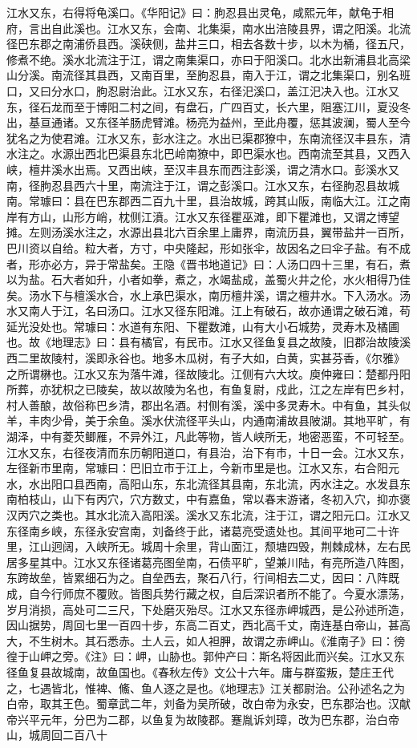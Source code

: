 \documentclass[12pt,UTF8]{ctexbook}
\begin{document}
江水又东，右得将龟溪口。《华阳记》曰：朐忍县出灵龟，咸熙元年，献龟于相府，言出自此溪也。江水又东，会南、北集渠，南水出涪陵县界，谓之阳溪。北流径巴东郡之南浦侨县西。溪硖侧，盐井三口，相去各数十步，以木为桶，径五尺，修煮不绝。溪水北流注于江，谓之南集渠口，亦曰于阳溪口。北水出新浦县北高梁山分溪。南流径其县西，又南百里，至朐忍县，南入于江，谓之北集渠口，别名班口，又曰分水口，朐忍尉治此。江水又东，右径汜溪口，盖江汜决入也。江水又东，径石龙而至于博阳二村之间，有盘石，广四百丈，长六里，阻塞江川，夏没冬出，基亘通诸。又东径羊肠虎臂滩。杨亮为益州，至此舟覆，惩其波澜，蜀人至今犹名之为使君滩。江水又东，彭水注之。水出已渠郡獠中，东南流径汉丰县东，清水注之。水源出西北巴渠县东北巴岭南獠中，即巴渠水也。西南流至其县，又西入峡，檀井溪水出焉。又西出峡，至汉丰县东而西注彭溪，谓之清水口。彭溪水又南，径朐忍县西六十里，南流注于江，谓之彭溪口。江水又东，右径朐忍县故城南。常璩曰：县在巴东郡西二百九十里，县治故城，跨其山阪，南临大江。江之南岸有方山，山形方峭，枕侧江濆。江水又东径瞿巫滩，即下瞿滩也，又谓之博望摊。左则汤溪水注之，水源出县北六百余里上庸界，南流历县，翼带盐井一百所，巴川资以自给。粒大者，方寸，中央隆起，形如张伞，故因名之曰伞子盐。有不成者，形亦必方，异于常盐矣。王隐《晋书地道记》曰：人汤口四十三里，有石，煮以为盐。石大者如升，小者如拳，煮之，水竭盐成，盖蜀火井之伦，水火相得乃佳矣。汤水下与檀溪水合，水上承巴渠水，南历檀井溪，谓之檀井水。下入汤水。汤水又南人于江，名曰汤口。江水又径东阳滩。江上有破石，故亦通谓之破石滩，苟延光没处也。常璩曰：水道有东阳、下瞿数滩，山有大小石城势，灵寿木及橘圃也。故《地理志》曰：县有橘官，有民市。江水又径鱼复县之故陵，旧郡治故陵溪西二里故陵村，溪即永谷也。地多木瓜树，有子大如，白黄，实甚芬香，《尔雅》之所谓楙也。江水又东为落牛滩，径故陵北。江侧有六大坟。庾仲雍曰：楚都丹阳所葬，亦犹枳之已陵矣，故以故陵为名也，有鱼复尉，戍此，江之左岸有巴乡村，村人善酿，故俗称巴乡清，郡出名酒。村侧有溪，溪中多灵寿木。中有鱼，其头似羊，丰肉少骨，美于余鱼。溪水伏流径平头山，内通南浦故县陂湖。其地平旷，有湖泽，中有菱芡鲫雁，不异外江，凡此等物，皆人峡所无，地密恶蛮，不可轻至。江水又东，右径夜清而东历朝阳道口，有县治，治下有市，十日一会。江水又东，左径新市里南，常璩曰：巴旧立市于江上，今新市里是也。江水又东，右合阳元水，水出阳口县西南，高阳山东，东北流径其县南，东北流，丙水注之。水发县东南柏枝山，山下有丙穴，穴方数丈，中有嘉鱼，常以春末游诸，冬初入穴，抑亦褒汉丙穴之类也。其水北流入高阳溪。溪水又东北流，注于江，谓之阳元口。江水又东径南乡峡，东径永安宫南，刘备终于此，诸葛亮受遗处也。其间平地可二十许里，江山迥阔，入峡所无。城周十余里，背山面江，颓塘四毁，荆棘成林，左右民居多星其中。江水又东径诸葛亮图垒南，石债平旷，望兼川陆，有亮所造八阵图，东跨故垒，皆累细石为之。自垒西去，聚石八行，行间相去二丈，因曰：八阵既成，自今行师庶不覆败。皆图兵势行藏之权，自后深识者所不能了。今夏水漂荡，岁月消损，高处可二三尺，下处磨灭殆尽。江水又东径赤岬城西，是公孙述所造，因山据势，周回七里一百四十步，东高二百丈，西北高千丈，南连基白帝山，甚高大，不生树木。其石悉赤。土人云，如人袒胛，故谓之赤岬山。《淮南子》曰：徬徨于山岬之旁。《注》曰：岬，山胁也。郭仲产曰：斯名将因此而兴矣。江水又东径鱼复县故城南，故鱼国也。《春秋左传》文公十六年。庸与群蛮叛，楚庄王代之，七遇皆北，惟裨、鯈、鱼人逐之是也。《地理志》江关都尉治。公孙述名之为白帝，取其王色。蜀章武二年，刘备为吴所破，改白帝为永安，巴东郡治也。汉献帝兴平元年，分巴为二郡，以鱼复为故陵郡。蹇胤诉刘璋，改为巴东郡，治白帝山，城周回二百八十
\end{document}
